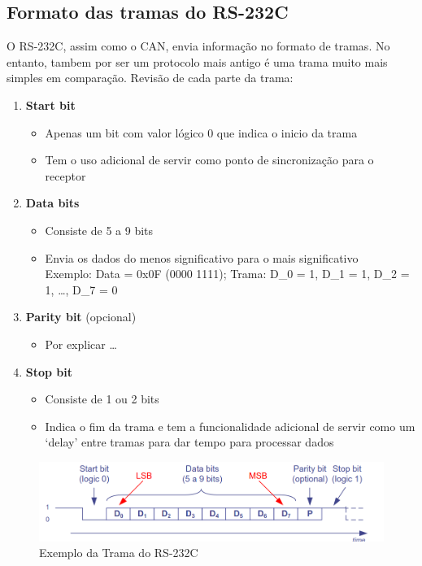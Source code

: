 \documentclass[a4paper, 12pt, onecolumn, oneside]{scrartcl}
\begin{document}
\subsection{Formato das tramas do RS-232C}
O RS-232C, assim como o CAN, envia informação no formato de tramas. No entanto, tambem por ser um protocolo mais antigo
é uma trama muito mais simples em comparação.
Revisão de cada parte da trama:
\begin{enumerate}
    \item \textbf{Start bit}
    \begin{itemize}
        \item Apenas um bit com valor lógico 0 que indica o inicio da trama
        \item Tem o uso adicional de servir como ponto de sincronização para o receptor 
    \end{itemize}
    \item \textbf{Data bits}
    \begin{itemize}
        \item Consiste de 5 a 9 bits
        \item Envia os dados do menos significativo para o mais significativo\\
        Exemplo: Data = 0x0F (0000 1111); Trama: D_0 = 1, D_1 = 1, D_2 = 1, \dots, D_7 = 0
    \end{itemize}
    \item \textbf{Parity bit} (opcional)
    \begin{itemize}
        \item Por explicar \dots
    \end{itemize}
    \item \textbf{Stop bit}
    \begin{itemize}
        \item Consiste de 1 ou 2 bits
        \item Indica o fim da trama e tem a funcionalidade adicional de servir como um `delay' entre tramas para dar tempo para processar dados
    \end{itemize}
\end{enumerate}

\begin{figure}[H]
    \centering
    \includegraphics[width=1\textwidth]{Trama-exemplo_RS-232C.png}
    \caption{Exemplo da Trama do RS-232C}\label{fig6}
\end{figure}
\end{document}
